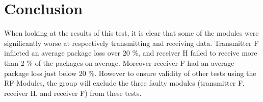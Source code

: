 \section*{Conclusion}
When looking at the results of this test, it is clear that some of the modules were significantly worse at respectively transmitting and receiving data.
Transmitter \textsf{F} inflicted an average package loss over 20 \%, and receiver \textsf{H} failed to receive more than 2 \% of the packages on average.
Moreover receiver \textsf{F} had an average package loss just below 20 \%.
However to ensure validity of other tests using the RF Modules, the group will exclude the three faulty modules (transmitter \textsf{F}, receiver \textsf{H}, and receiver \textsf{F}) from these tests.
